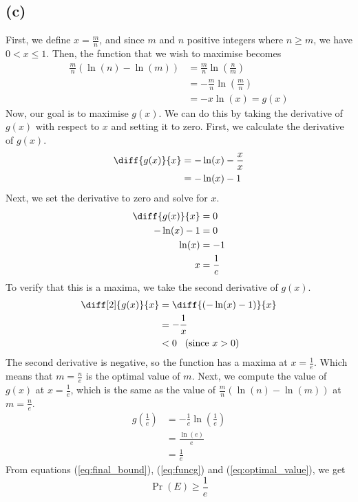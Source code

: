 \subsection{(c)}
First, we define $x=\frac{m}{n}$, and since $m$ and $n$ positive integers where $n \geq m$, we have $0< x\leq 1$. Then, the function that we wish to maximise becomes
\begin{align}\label{eq:funcg}
	\frac{m}{n} \left(\ln(n) - \ln(m)\right) & = \frac{m}{n}\ln\left(\frac{n}{m}\right) \nonumber  \\
	                                         & = -\frac{m}{n}\ln\left(\frac{m}{n}\right) \nonumber \\
	                                         & = -x\ln(x) = g(x)
\end{align}
Now, our goal is to maximise $g(x)$. We can do this by taking the derivative of $g(x)$ with respect to $x$ and setting it to zero.
First, we calculate the derivative of $g(x)$.
\begin{align*}
	\diff{g(x)}{x} & = -\ln(x) - \frac{x}{x} \\
	               & = -\ln(x) - 1
\end{align*}
Next, we set the derivative to zero and solve for $x$.
\begin{align*}
	\diff{g(x)}{x} & = 0           \\
	-\ln(x) - 1    & = 0           \\
	\ln(x)         & = -1          \\
	x              & = \frac{1}{e}
\end{align*}
To verify that this is a maxima, we take the second derivative of $g(x)$.
\begin{align*}
	\diff[2]{g(x)}{x} & = \diff{\left(-\ln(x)-1\right)}{x} \\
	                  & = -\frac{1}{x}                     \\
	                  & < 0 \text{\,\,\,  (since $x>0$)}
\end{align*}
The second derivative is negative, so the function has a maxima at $x=\frac{1}{e}$.
Which means that $m = \frac{n}{e}$ is the optimal value of $m$.
Next, we compute the value of $g(x)$ at $x = \frac{1}{e}$, which is the same as the value of $\frac{m}{n}\left(\ln(n)-\ln(m)\right)$ at $m=\frac{n}{e}$.
\begin{align}\label{eq:optimal_value}
	g\left(\frac{1}{e}\right) & = -\frac{1}{e}\ln\left(\frac{1}{e}\right) \nonumber \\
	                          & = \frac{\ln(e)}{e}                        \nonumber \\
	                          & = \frac{1}{e}
\end{align}
From equations (\ref{eq:final_bound}), (\ref{eq:funcg}) and (\ref{eq:optimal_value}), we get
\[\Pr(E) \geq \frac{1}{e}\]

